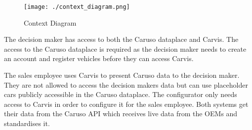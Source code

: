 \begin{figure}[ht]
  \centering
  \texttt{[image: ./context\_diagram.png]}
  \caption{Context Diagram}
  \label{ScopeOfWork:ContextDiagram}
\end{figure}

The decision maker has access to both the Caruso dataplace and Carvis. The access to the Caruso dataplace is required as the decision maker needs to create an account and register vehicles before they can access Carvis.

The sales employee uses Carvis to present Caruso data to the decision maker. They are not allowed to access the decision makers data but can use placeholder cars publicly accessible in the Caruso dataplace. The configurator only needs access to Carvis in order to configure it for the sales employee. Both systems get their data from the Caruso API which receives live data from the OEMs and standardises it.
